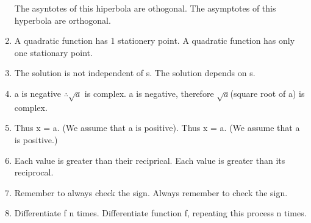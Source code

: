 \documentclass[11pt]{article}
\begin{document}
\begin{enumerate}
The asyntotes of this hiperbola are othogonal. \textrightarrow \hspace*{0.25cm} The asymptotes of this hyperbola are orthogonal.
\item
A quadratic function has 1 stationery point. \textrightarrow \hspace*{0.25cm} A quadratic function has only one stationary point.
\item
The solution is not independent of s. \textrightarrow \hspace*{0.25cm} The solution depends on s.
\item
a is negative $\therefore\sqrt{a}$ is complex. \textrightarrow \hspace*{0.25cm} a is negative, therefore $\sqrt{a}$(square root of a) is complex.
\item
Thus x = a. (We assume that a is positive). \textrightarrow \hspace*{0.25cm} Thus x = a. (We assume that a is positive.)
\item
Each value is greater than their reciprical. \textrightarrow \hspace*{0.25cm} Each value is greater than its reciprocal.
\item
Remember to always check the sign. \textrightarrow \hspace*{0.25cm} Always remember to check the sign.
\item
Differentiate f n times. \textrightarrow \hspace*{0.25cm}  	Differentiate function f, repeating this process n times.
\end{enumerate}
\end{document}
